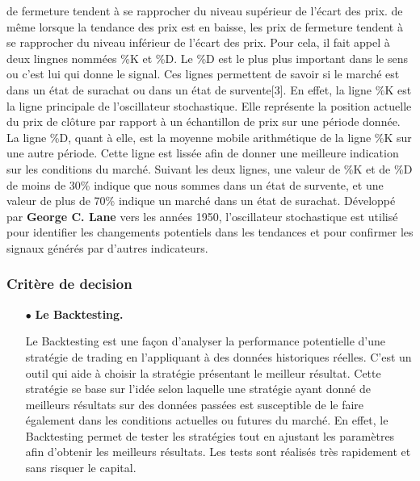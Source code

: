 \begin{itemize}
{    de fermeture tendent à se rapprocher du niveau supérieur de l'écart des prix. de même lorsque 
    la tendance des prix est en baisse, les prix de fermeture tendent à se rapprocher du 
    niveau inférieur de l'écart des prix.
    Pour cela, il fait appel à deux lingnes nommées \%K et \%D. 
    Le \%D est le plus plus important dans le sens ou c'est lui qui donne le signal.
    Ces lignes permettent de savoir si le marché est dans un état de surachat ou dans un état de survente[3].
    En effet, la ligne \%K est la ligne principale de l'oscillateur stochastique. Elle représente la position
    actuelle du prix de clôture par rapport à un échantillon de prix sur une période donnée.
    La ligne \%D, quant à elle, est la moyenne mobile arithmétique de la ligne \%K sur une autre période.
    Cette ligne est lissée afin de donner une meilleure indication sur les conditions du marché.
    Suivant les deux lignes, une valeur de \%K et de \%D de moins de 30\% indique que nous sommes dans un état de survente, et une valeur
    de plus de 70\% indique un marché dans un état de surachat. 
    Développé par \textbf{George C. Lane} vers les années 1950, l'oscillateur stochastique est utilisé pour identifier
    les changements potentiels dans les tendances et pour confirmer les signaux générés par d'autres indicateurs.}

\end{itemize}

\subsubsection{Critère de decision }
\begin{itemize}
\item[$\bullet$] \textbf{Le Backtesting.}
\par{Le Backtesting est une façon d'analyser la performance potentielle d'une stratégie de 
trading en l'appliquant à des données historiques réelles. C'est un outil qui aide à choisir
la stratégie présentant le meilleur résultat. Cette stratégie se base sur l'idée selon laquelle
une stratégie ayant donné de meilleurs résultats sur des données passées est susceptible de le faire également
dans les conditions actuelles ou futures du marché. En effet, le Backtesting permet de tester les stratégies
tout en ajustant les paramètres afin d'obtenir les meilleurs résultats. Les tests sont réalisés très rapidement
et sans risquer le capital.}
\end{itemize}

